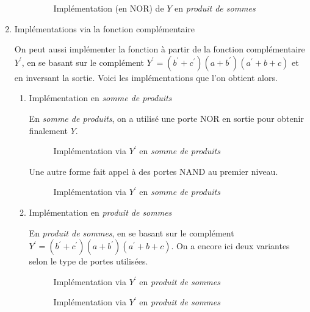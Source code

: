 \documentclass[letter, oneside]{book}
\begin{document}
\begin{enumerate}
\begin{enumerate}
\begin{figure}[htbp]
\centering

\caption{\label{fig:org65be89e}Implémentation (en NOR) de \(Y\) en \emph{produit de sommes}}
\end{figure}
\end{enumerate}


\item Implémentations via la fonction complémentaire
\label{sec:org3b18a82}

On peut aussi implémenter la fonction à partir de la fonction
complémentaire \(Y^\prime\), en se basant sur le complément \(Y^\prime
= (b^\prime +c^\prime )(a+b^\prime )(a^\prime +b+c)\) et en inversant
la sortie. Voici les implémentations que l'on obtient alors.

\begin{enumerate}
\item Implémentation en \emph{somme de produits}
\label{sec:orgf54fa9b}

En \emph{somme de produits}, on a utilisé une porte NOR en sortie pour
obtenir finalement \(Y\).

\begin{figure}[htbp]
\centering

\caption{\label{fig:org7fe2f03}Implémentation via \(Y^\prime\) en \emph{somme de produits}}
\end{figure} 

Une autre forme fait appel à des portes NAND au premier niveau.

\begin{figure}[htbp]
\centering

\caption{\label{fig:orga4bf9f3}Implémentation via \(Y^\prime\) en \emph{somme de produits}}
\end{figure} 

\item Implémentation en \emph{produit de sommes}
\label{sec:orgd9c8ef9}

En \emph{produit de sommes}, en se basant sur le complément \(Y^\prime =
(b^\prime +c^\prime )(a+b^\prime )(a^\prime +b+c)\). On a encore ici
deux variantes selon le type de portes utilisées.

\begin{figure}[htbp]
\centering

\caption{\label{fig:orgb0d24f1}Implémentation via \(Y^\prime\) en \emph{produit de sommes}}
\end{figure} 


\begin{figure}[htbp]
\centering

\caption{\label{fig:orgb9b25cd}Implémentation via \(Y^\prime\) en \emph{produit de sommes}}
\end{figure}
\end{enumerate}
\end{enumerate}
\end{document}
